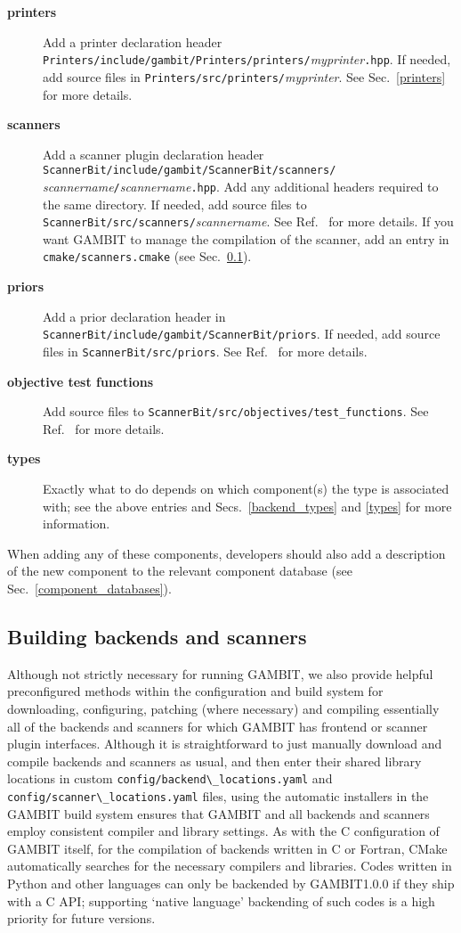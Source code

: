 \documentclass[pdftex,twocolumn,epjc3_preprint,runningheads]{svjour3}
\renewcommand{\_}{\discretionary{\underscore}{}{\underscore}}
\newcommand\term[1]{{\lstset{style=terminal}\lstinline!#1!\lstset{style=cpp}}}
\newcommand{\metavarf}[1]{\textit{\color{darkgreen}\footnotesize\textrm{#1}}}
\newcommand{\metavar}{\metavarf}
\newcommand{\gambit}{\textsf{GAMBIT}\xspace}
\newcommand{\GB}{\gambit}
\newcommand\xx{\raisebox{0.2ex}{\smaller ++}\xspace}
\newcommand\Cpp{\textsf{C\xx}\xspace}
\newcommand\plainC{\textsf{C}\xspace}
\newcommand\Python{\textsf{Python}\xspace}
\newcommand\python{\Python}
\newcommand\Fortran{\textsf{Fortran}\xspace}
\begin{document}
\begin{description}
\item[\textbf{printers}] Add a printer declaration header \term{Printers/include/gambit/Printers/printers/}\metavar{my\_printer}\term{.hpp}. If needed, add source files in \term{Printers/src/printers/}\metavar{my\_printer}.  See Sec.\ \ref{printers} for more details.
\item[\textbf{scanners}] Add a scanner plugin declaration header \term{ScannerBit/include/gambit/ScannerBit/scanners/} \metavar{scanner\_name}\term{/}\metavar{scanner\_name}\term{.hpp}.  Add any additional headers required to the same directory. If needed, add source files to \term{ScannerBit/src/scanners/}\metavar{scanner\_name}.  See Ref.\ \cite{ScannerBit} for more details.  If you want \GB to manage the compilation of the scanner, add an entry in \term{cmake/scanners.cmake} (see Sec.\ \ref{cmake_backends_scanners}).
\item[\textbf{priors}] Add a prior declaration header in \term{ScannerBit/include/gambit/ScannerBit/priors}. If needed, add source files in \term{ScannerBit/src/priors}.  See Ref.\ \cite{ScannerBit} for more details.
\item[\textbf{objective test functions}] Add source files to \term{ScannerBit/src/objectives/test_functions}.  See Ref.\ \cite{ScannerBit} for more details.
\item[\textbf{types}] Exactly what to do depends on which component(s) the type is associated with; see the above entries and Secs.\ \ref{backend_types} and \ref{types} for more information.
\end{description}
When adding any of these components, developers should also add a description of the new component to the relevant component database (see Sec.\ \ref{component_databases}).

\subsection{Building backends and scanners}
\label{cmake_backends_scanners}

Although not strictly necessary for running \GB, we also provide helpful preconfigured methods within the configuration and build system for downloading, configuring, patching (where necessary) and compiling essentially all of the backends and scanners for which \GB has frontend or scanner plugin interfaces.  Although it is straightforward to just manually download and compile backends and scanners as usual, and then enter their shared library locations in custom \term{config/backend\_locations.yaml} and \term{config/scanner\_locations.yaml} files, using the automatic installers in the \GB build system ensures that \GB and all backends and scanners employ consistent compiler and library settings.  As with the \Cpp configuration of \GB itself, for the compilation of backends written in \plainC or \Fortran, \textsf{CMake} automatically searches for the necessary compilers and libraries.  Codes written in \python and other languages can only be backended by \GB \textsf{1.0.0} if they ship with a \plainC API; supporting `native language' backending of such codes is a high priority for future versions.
\end{document}

